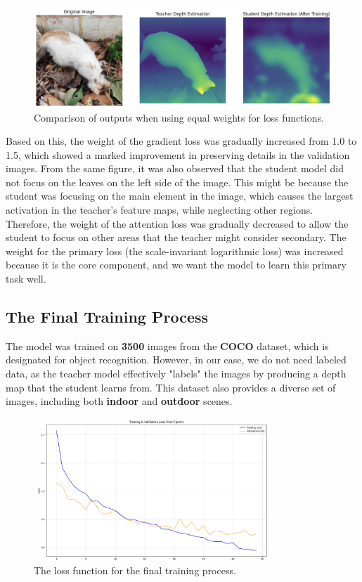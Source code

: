 \begin{figure}[htbp!]
    \centering
    \includegraphics[width=\textwidth]{images/loss_tuning_result.png}
    \caption{Comparison of outputs when using equal weights for loss functions.}
    \label{fig:loss_tuning}
\end{figure}

Based on this, the weight of the gradient loss was gradually increased from 1.0 to 1.5, which showed a marked improvement in preserving details in the validation images. From the same figure, it was also observed that the student model did not focus on the leaves on the left side of the image. This might be because the student was focusing on the main element in the image, which causes the largest activation in the teacher's feature maps, while neglecting other regions. Therefore, the weight of the attention loss was gradually decreased to allow the student to focus on other areas that the teacher might consider secondary. The weight for the primary loss (the scale-invariant logarithmic loss) was increased because it is the core component, and we want the model to learn this primary task well.

\subsection{The Final Training Process}
\label{subsec:final_training}

The model was trained on \textbf{3500} images from the \textbf{COCO} dataset, which is designated for object recognition. However, in our case, we do not need labeled data, as the teacher model effectively "labels" the images by producing a depth map that the student learns from. This dataset also provides a diverse set of images, including both \textbf{indoor} and \textbf{outdoor} scenes.

\begin{figure}[htbp!]
    \centering
    \includegraphics[width=0.8\textwidth]{images/training_loss_graph.png}
    \caption{The loss function for the final training process.}
    \label{fig:loss_graph}
\end{figure}

